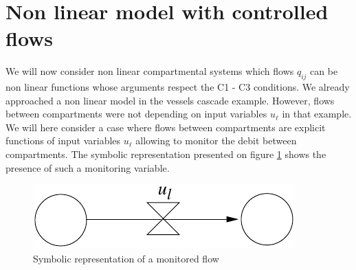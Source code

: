 \section{Non linear model with controlled flows}
We will now consider non linear compartmental systems which flows $q_{ij}$ can be non linear functions whose arguments respect the C1 - C3 conditions.
We already approached a non linear model in the vessels cascade example.
However, flows between compartments were not depending on input variables $u_{\ell}$ in that example.
We will here consider a case where flows between compartments are explicit functions of input variables $u_{\ell}$ 
allowing to monitor the debit between compartments.
The symbolic representation presented on figure \ref{Fig:contflux} shows the presence of such a monitoring variable.
\begin{figure}[ht] 
\begin{center}
\includegraphics{images/contflux}
\caption{Symbolic representation of a monitored flow}
\label{Fig:contflux}
\end{center} 
\end{figure}


